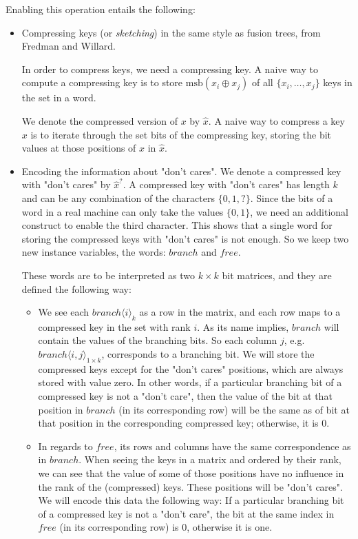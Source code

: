Enabling this operation entails the following:
\begin{itemize}
    \item
    Compressing keys (or \textit{sketching}) in the same style as fusion trees, from Fredman and Willard.
    
    In order to compress keys, we need a compressing key. A naive way to compute a compressing key is to store $\text{msb}(x_i \oplus x_j)$ of all $\{x_i, \dots, x_j\}$ keys in the set in a word.
    
    We denote the compressed version of $x$ by $\hat x $. A naive way to compress a key $x$ is to iterate through the set bits of the compressing key, storing the bit values at those positions of $x$ in $\hat x$.
    
    \item
    Encoding the information about "don't cares". We denote a compressed key with "don't cares" by $\hat x^?$. A compressed key with "don't cares" has length $k$ and can be any combination of the characters $\{0, 1, ?\}$. Since the bits of a word in a real machine can only take the values $\{0, 1\}$, we need an additional construct to enable the third character. This shows that a single word for storing the compressed keys with "don't cares" is not enough. So we keep two new instance variables, the words: $branch$ and $free$.
    
    These words are to be interpreted as two $k \times k$ bit matrices, and they are defined the following way:
    \begin{itemize}
        \item
        We see each $branch\langle i \rangle_k$ as a row in the matrix, and each row maps to a compressed key in the set with rank $i$.
        As its name implies, $branch$ will contain the values of the branching bits. 
        So each column $j$, e.g. $branch\langle i, j\rangle_{1 \times k}$, corresponds to a branching bit.
        We will store the compressed keys except for the "don't cares" positions, which are always stored with value zero.
        In other words, if a particular branching bit of a compressed key is not a "don't care", then the value of the bit at that position in $branch$ (in its corresponding row) will be the same as of bit at that position in the corresponding compressed key; otherwise, it is 0.
        
        \item
        In regards to $free$, its rows and columns have the same correspondence as in $branch$.
        When seeing the keys in a matrix and ordered by their rank, we can see that the value of some of those positions have no influence in the rank of the (compressed) keys.
        These positions will be "don't cares".
        We will encode this data the following way: If a particular branching bit of a compressed key is not a "don't care", the bit at the same index in $free$ (in its corresponding row) is 0, otherwise it is one.
    \end{itemize}


\end{itemize}
